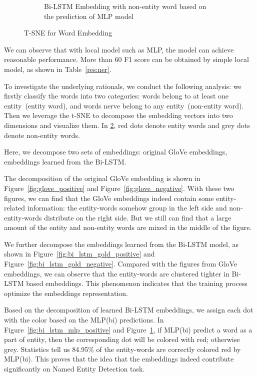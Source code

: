 \documentclass{article}
\begin{document}
\begin{figure}[t]
\begin{subfigure}[t]{0.24\textwidth}
		\caption{Bi-LSTM Embedding with non-entity word based on the prediction of MLP model}
		\label{fig:bi_lstm_mlp_negative}
	\end{subfigure}
	\caption{T-SNE for Word Embedding}
	\label{fig:embedding}
\end{figure}

We can observe that with local model such as MLP, the model can achieve reasonable performance. More than 60 F1 score can be obtained by simple local model, as shown in Table~\ref{res:ner}. %

To investigate the underlying rationals, we conduct the following analysis: we firstly classify the words into two categories: words belong to at least one entity~(entity word), and words nerve belong to any entity~(non-entity word). Then we leverage the t-SNE to decompose the embedding vectors into two dimensions and visualize them. In \ref{fig:embedding}, red dots denote entity words and grey dots denote non-entity words. 

Here, we decompose two sets of embeddings: original GloVe embeddings, embeddings learned from the Bi-LSTM.

The decomposition of the original GloVe embedding is shown in Figure~\ref{fig:glove_positive} and Figure~\ref{fig:glove_negative}. With these two figures, we can find that the GloVe embeddings indeed contain some entity-related information: the entity-words somehow group in the left side and non-entity-words distribute on the right side. But we still can find that a large amount of the entity and non-entity words are mixed in the middle of the figure. 

We further decompose the embeddings learned from the Bi-LSTM model, as shown in Figure~\ref{fig:bi_lstm_gold_positive} and Figure~\ref{fig:bi_lstm_gold_negative}. Compared with the figures from GloVe embeddings, we can observe that the entity-words are clustered tighter in Bi-LSTM based embeddings. This phenomenon indicates that the training process optimize the embeddings representation.

Based on the decomposition of learned Bi-LSTM embeddings, we assign each dot with the color based on the MLP(bi) predictions. In Figure~\ref{fig:bi_lstm_mlp_positive} and Figure~\ref{fig:bi_lstm_mlp_negative}, if MLP(bi) predict a word as a part of entity, then the corresponding dot will be colored with red; otherwise grey. Statistics tell us 84.95\% of the entity-words are correctly colored red by MLP(bi). This proves that the idea that the embeddings indeed contribute significantly on Named Entity Detection task.
\end{document}
